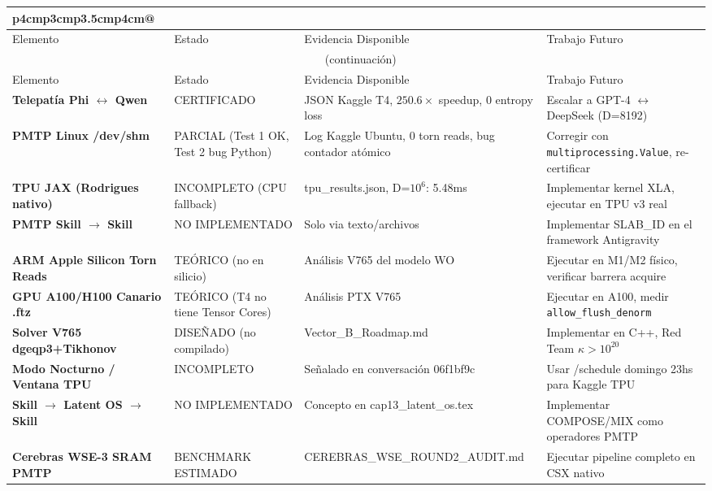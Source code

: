 \begin{tabular}{llll}p{4cm}p{3cm}p{3.5cm}p{4cm}@{}}

 \\
\hline
Elemento & Estado & Evidencia Disponible & Trabajo Futuro \\
\hline
\endfirsthead
\multicolumn{4}{c}{\tablename\ \thetable{} (continuación)} \\
\hline
Elemento & Estado & Evidencia Disponible & Trabajo Futuro \\
\hline
\endhead
\hline
\endfoot

\textbf{Telepatía Phi $\leftrightarrow$ Qwen} &
CERTIFICADO & JSON Kaggle T4, $250.6\times$ speedup, 0 entropy loss &
Escalar a GPT-4 $\leftrightarrow$ DeepSeek (D=8192) \\

\textbf{PMTP Linux /dev/shm} &
PARCIAL (Test 1 OK, Test 2 bug Python) &
Log Kaggle Ubuntu, 0 torn reads, bug contador atómico &
Corregir con \texttt{multiprocessing.Value}, re-certificar \\

\textbf{TPU JAX (Rodrigues nativo)} &
INCOMPLETO (CPU fallback) &
tpu\_results.json, D=$10^6$: 5.48ms & Implementar kernel XLA, ejecutar en TPU v3 real \\

\textbf{PMTP Skill $\to$ Skill} &
NO IMPLEMENTADO &
Solo via texto/archivos &
Implementar SLAB\_ID en el framework Antigravity \\

\textbf{ARM Apple Silicon Torn Reads} &
TEÓRICO (no en silicio) &
Análisis V765 del modelo WO &
Ejecutar en M1/M2 físico, verificar barrera acquire \\

\textbf{GPU A100/H100 Canario .ftz} &
TEÓRICO (T4 no tiene Tensor Cores) &
Análisis PTX V765 &
Ejecutar en A100, medir \texttt{allow\_flush\_denorm} \\

\textbf{Solver V765 dgeqp3+Tikhonov} &
DISEÑADO (no compilado) &
Vector\_B\_Roadmap.md &
Implementar en C++, Red Team $\kappa > 10^{20}$ \\

\textbf{Modo Nocturno / Ventana TPU} &
INCOMPLETO &
Señalado en conversación 06f1bf9c &
Usar /schedule domingo 23hs para Kaggle TPU \\

\textbf{Skill $\to$ Latent OS $\to$ Skill} &
NO IMPLEMENTADO &
Concepto en cap13\_latent\_os.tex &
Implementar COMPOSE/MIX como operadores PMTP \\

\textbf{Cerebras WSE-3 SRAM PMTP} &
BENCHMARK ESTIMADO &
CEREBRAS\_WSE\_ROUND2\_AUDIT.md &
Ejecutar pipeline completo en CSX nativo \\

\end{tabular}

